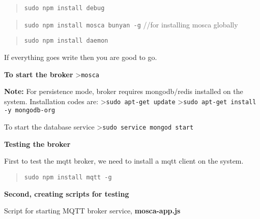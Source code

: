 \documentclass[16pt]{article}
\begin{document}
\begin{enumerate}
\begin{quote}
\texttt{sudo npm install debug}
\end{quote}

\begin{quote}
\texttt{sudo npm install mosca bunyan -g} //for installing mosca
globally
\end{quote}

\begin{quote}
\texttt{sudo npm install daemon}
\end{quote}



If everything goes write then you are good to go.

 \vspace{0.3cm}

\textbf{To start the broker} \textgreater{}\texttt{mosca}

\textbf{Note:} For persistence mode, broker requires mongodb/redis
installed on the system. Installation codes are:
\textgreater{}\texttt{sudo apt-get update}
\textgreater{}\texttt{sudo apt-get install -y mongodb-org}

To start the database service
\textgreater{}\texttt{sudo service mongod start}

 \vspace{0.5cm}

{\Large{\textbf{Testing the broker}}}

First to test the mqtt broker, we need to install a mqtt client on the
system.

\begin{quote}
\texttt{sudo npm install mqtt -g}
\end{quote}

\textbf{Second, creating scripts for testing}

Script for starting MQTT broker service, \textbf{mosca-app.js}




\end{enumerate}
\end{document}
